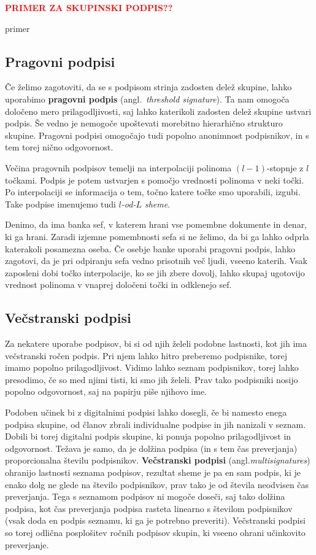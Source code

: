\documentclass[isrm2, tisk]{fmfdelo}
\newcommand{\todo}[1]{\textcolor{red}{\textbf{\uppercase{#1}??}}}
\begin{document}
\todo{primer za skupinski podpis}
\begin{primer}
    primer
\end{primer}

\subsection{Pragovni podpisi}
Če želimo zagotoviti, da se s podpisom strinja zadosten delež skupine, lahko uporabimo \textbf{pragovni 
podpis} (angl.\ \textit{threshold signature}). Ta nam omogoča določeno mero prilagodljivosti, saj lahko 
katerikoli zadosten delež skupine ustvari podpis. Še vedno je nemogoče upoštevati morebitno hierarhično
strukturo skupine. Pragovni podpisi omogočajo tudi popolno anonimnost podpisnikov, in s tem torej 
nično odgovornost. 

Večina pragovnih podpisov temelji na interpolaciji polinoma $(l - 1)$-stopnje z $l$ točkami. Podpis je 
potem ustvarjen s pomočjo vrednosti polinoma v neki točki. Po interpolaciji se informacija o tem, točno 
katere točke smo uporabili, izgubi. Take podpise imenujemo tudi \textit{$l$-od-$L$ sheme}.

\begin{primer}
    Denimo, da ima banka sef, v katerem hrani vse pomembne dokumente in denar, ki ga hrani. Zaradi
    izjemne pomembnosti sefa si ne želimo, da bi ga lahko odprla katerakoli posamezna oseba. Če 
    osebje banke uporabi pragovni podpis, lahko zagotovi, da je pri odpiranju sefa vedno prisotnih
    več ljudi, vseeno katerih. Vsak zaposleni dobi točko interpolacije, ko se jih zbere dovolj,
    lahko skupaj ugotovijo vrednost polinoma v vnaprej določeni točki in odklenejo sef.
\end{primer}

\subsection{Večstranski podpisi}
\label{sec:multisig}
Za nekatere uporabe podpisov, bi si od njih želeli podobne lastnosti, kot jih ima večstranski ročen podpis. 
Pri njem lahko hitro preberemo podpisnike, torej imamo popolno prilagodljivost. Vidimo lahko seznam 
podpisnikov, torej lahko presodimo, če so med njimi tisti, ki smo jih želeli. Prav tako podpisniki nosijo 
popolno odgovornost, saj na papirju piše njihovo ime. 

Podoben učinek bi z digitalnimi podpisi lahko dosegli, če bi namesto enega podpisa skupine, od članov 
zbrali individualne podpise in jih nanizali v seznam. Dobili bi torej digitalni podpis skupine, ki 
ponuja popolno prilagodljivost in odgovornost. Težava je samo, da je dolžina podpisa (in s tem čas 
preverjanja) proporcionalna številu podpisnikov. \textbf{Večstranski podpisi} (angl.\textit{multisignatures})
ohranijo lastnosti seznama podpisov, rezultat sheme je pa en sam podpis, ki je enako dolg ne glede 
na število podpisnikov, prav tako je od števila neodvisen čas preverjanja. Tega s seznamom podpisov 
ni mogoče doseči, saj tako dolžina podpisa, kot čas preverjanja podpisa rasteta linearno s številom 
podpisnikov (vsak doda en podpis seznamu, ki ga je potrebno preveriti). Večstranski podpisi so torej 
odlična posplošitev ročnih podpisov skupin, ki vseeno ohrani učinkovito preverjanje.
\end{document}
